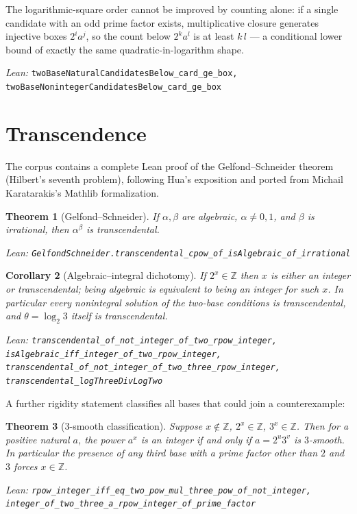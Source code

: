 \documentclass[11pt]{article}
\newtheorem{theorem}{Theorem}[section]
\newtheorem{corollary}[theorem]{Corollary}
\theoremstyle{definition}
\theoremstyle{remark}
\newcommand{\Z}{\mathbb{Z}}
\newcommand{\thetaq}{\theta}
\newcommand{\lean}[1]{\par\smallskip\noindent\begingroup\footnotesize\raggedright\emph{Lean:} \texttt{#1}\par\endgroup}
\begin{document}
The logarithmic-square order cannot be improved by counting alone: if a single candidate
with an odd prime factor exists, multiplicative closure generates injective boxes
$2^i a^j$, so the count below $2^k a^l$ is at least $k\,l$ --- a conditional lower bound of
exactly the same quadratic-in-logarithm shape.
\lean{twoBaseNaturalCandidatesBelow\_card\_ge\_box,
twoBaseNonintegerCandidatesBelow\_card\_ge\_box}

\section{Transcendence}\label{sec:transcendence}

The corpus contains a complete Lean proof of the Gelfond--Schneider theorem (Hilbert's
seventh problem), following Hua's exposition \cite{Hua82} and ported from Michail
Karatarakis's Mathlib formalization.

\begin{theorem}[Gelfond--Schneider]\label{thm:gs}
If $\alpha,\beta$ are algebraic, $\alpha\neq 0,1$, and $\beta$ is irrational, then
$\alpha^{\beta}$ is transcendental.
\lean{GelfondSchneider.transcendental\_cpow\_of\_isAlgebraic\_of\_irrational}
\end{theorem}

\begin{corollary}[Algebraic--integral dichotomy]\label{cor:transcendental}
If $2^x\in\Z$ then $x$ is either an integer or transcendental; being algebraic is
\emph{equivalent} to being an integer for such $x$. In particular every nonintegral solution
of the two-base conditions is transcendental, and $\thetaq=\log_2 3$ itself is
transcendental.
\lean{transcendental\_of\_not\_integer\_of\_two\_rpow\_integer,
isAlgebraic\_iff\_integer\_of\_two\_rpow\_integer,
transcendental\_of\_not\_integer\_of\_two\_three\_rpow\_integer,
transcendental\_logThreeDivLogTwo}
\end{corollary}

A further rigidity statement classifies all bases that could join a counterexample:

\begin{theorem}[$3$-smooth classification]\label{thm:threesmooth}
Suppose $x\notin\Z$, $2^x\in\Z$, $3^x\in\Z$. Then for a positive natural $a$, the power
$a^x$ is an integer \emph{if and only if} $a=2^u 3^v$ is $3$-smooth. In particular the
presence of any third base with a prime factor other than $2$ and $3$ forces $x\in\Z$.
\lean{rpow\_integer\_iff\_eq\_two\_pow\_mul\_three\_pow\_of\_not\_integer,
integer\_of\_two\_three\_a\_rpow\_integer\_of\_prime\_factor}
\end{theorem}
\end{document}
